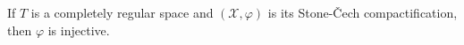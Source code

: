If $T$ is a completely regular space and $(\mathcal{X}, \varphi)$ is its Stone-Čech compactification, then $\varphi$ is injective.
